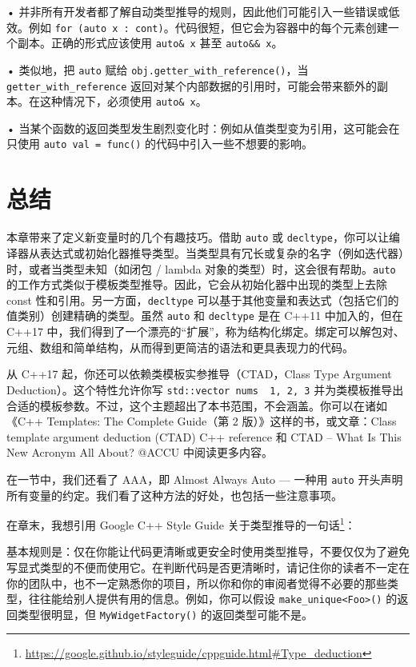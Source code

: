 • 并非所有开发者都了解自动类型推导的规则，因此他们可能引入一些错误或低效。例如 \texttt{for (auto x : cont)}。代码很短，但它会为容器中的每个元素创建一个副本。正确的形式应该使用 \texttt{auto\& x} 甚至 \texttt{auto\&\& x}。

• 类似地，把 \texttt{auto} 赋给 \texttt{obj.getter\_with\_reference()}，当 \texttt{getter\_with\_reference} 返回对某个内部数据的引用时，可能会带来额外的副本。在这种情况下，必须使用 \texttt{auto\& x}。

• 当某个函数的返回类型发生剧烈变化时：例如从值类型变为引用，这可能会在只使用 \texttt{auto val = func()} 的代码中引入一些不想要的影响。

\section{总结}

本章带来了定义新变量时的几个有趣技巧。借助 \texttt{auto} 或 \texttt{decltype}，你可以让编译器从表达式或初始化器推导类型。当类型具有冗长或复杂的名字（例如迭代器）时，或者当类型未知（如闭包 / lambda 对象的类型）时，这会很有帮助。\texttt{auto} 的工作方式类似于模板类型推导。因此，它会从初始化器中出现的类型上去除 const 性和引用。另一方面，\texttt{decltype} 可以基于其他变量和表达式（包括它们的值类别）创建精确的类型。虽然 \texttt{auto} 和 \texttt{decltype} 是在 C++11 中加入的，但在 C++17 中，我们得到了一个漂亮的“扩展”，称为结构化绑定。绑定可以解包对、元组、数组和简单结构，从而得到更简洁的语法和更具表现力的代码。

\begin{myInfoBox}
从 C++17 起，你还可以依赖类模板实参推导（CTAD，Class Type Argument Deduction）。这个特性允许你写 \texttt{std::vector nums { 1, 2, 3}} 并为类模板推导出合适的模板参数。不过，这个主题超出了本书范围，不会涵盖。你可以在诸如《C++ Templates: The Complete Guide（第 2 版）》这样的书，或文章：Class template argument deduction (CTAD) C++ reference 和 CTAD – What Is This New Acronym All About? @ACCU 中阅读更多内容。
\end{myInfoBox}


在一节中，我们还看了 AAA，即 Almost Always Auto — 一种用 \texttt{auto} 开头声明所有变量的约定。我们看了这种方法的好处，也包括一些注意事项。

在章末，我想引用 Google C++ Style Guide 关于类型推导的一句话\footnote{\url{https://google.github.io/styleguide/cppguide.html\#Type_deduction}}：

\begin{myQuote}
基本规则是：仅在你能让代码更清晰或更安全时使用类型推导，不要仅仅为了避免写显式类型的不便而使用它。在判断代码是否更清晰时，请记住你的读者不一定在你的团队中，也不一定熟悉你的项目，所以你和你的审阅者觉得不必要的那些类型，往往能给别人提供有用的信息。例如，你可以假设 \texttt{make\_unique<Foo>()} 的返回类型很明显，但 \texttt{MyWidgetFactory()} 的返回类型可能不是。
\end{myQuote}
